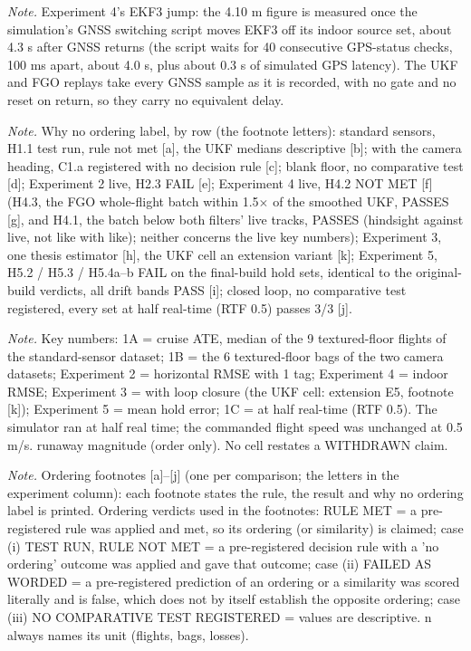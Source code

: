 \begin{table}[htbp]
\textit{Note.} Experiment 4's EKF3 jump: the 4.10 m figure is measured once the simulation's GNSS switching script moves EKF3 off its indoor source set, about 4.3 s after GNSS returns (the script waits for 40 consecutive GPS-status checks, 100 ms apart, about 4.0 s, plus about 0.3 s of simulated GPS latency). The UKF and FGO replays take every GNSS sample as it is recorded, with no gate and no reset on return, so they carry no equivalent delay.\par
\textit{Note.} Why no ordering label, by row (the footnote letters): standard sensors, H1.1 test run, rule not met [a], the UKF medians descriptive [b]; with the camera heading, C1.a registered with no decision rule [c]; blank floor, no comparative test [d]; Experiment 2 live, H2.3 FAIL [e]; Experiment 4 live, H4.2 NOT MET [f] (H4.3, the FGO whole-flight batch within 1.5$\times$ of the smoothed UKF, PASSES [g], and H4.1, the batch below both filters' live tracks, PASSES (hindsight against live, not like with like); neither concerns the live key numbers); Experiment 3, one thesis estimator [h], the UKF cell an extension variant [k]; Experiment 5, H5.2 / H5.3 / H5.4a--b FAIL on the final-build hold sets, identical to the original-build verdicts, all drift bands PASS [i]; closed loop, no comparative test registered, every set at half real-time (RTF 0.5) passes 3/3 [j].\par
\textit{Note.} Key numbers: 1A = cruise ATE, median of the 9 textured-floor flights of the standard-sensor dataset; 1B = the 6 textured-floor bags of the two camera datasets; Experiment 2 = horizontal RMSE with 1 tag; Experiment 4 = indoor RMSE; Experiment 3 = with loop closure (the UKF cell: extension E5, footnote [k]); Experiment 5 = mean hold error; 1C = at half real-time (RTF 0.5). The simulator ran at half real time; the commanded flight speed was unchanged at 0.5 m/s. \textdagger{} runaway magnitude (order only). No cell restates a WITHDRAWN claim.\par
\textit{Note.} Ordering footnotes [a]--[j] (one per comparison; the letters in the experiment column): each footnote states the rule, the result and why no ordering label is printed. Ordering verdicts used in the footnotes: RULE MET = a pre-registered rule was applied and met, so its ordering (or similarity) is claimed; case (i) TEST RUN, RULE NOT MET = a pre-registered decision rule with a 'no ordering' outcome was applied and gave that outcome; case (ii) FAILED AS WORDED = a pre-registered prediction of an ordering or a similarity was scored literally and is false, which does not by itself establish the opposite ordering; case (iii) NO COMPARATIVE TEST REGISTERED = values are descriptive. n always names its unit (flights, bags, losses).\par

\end{table}
